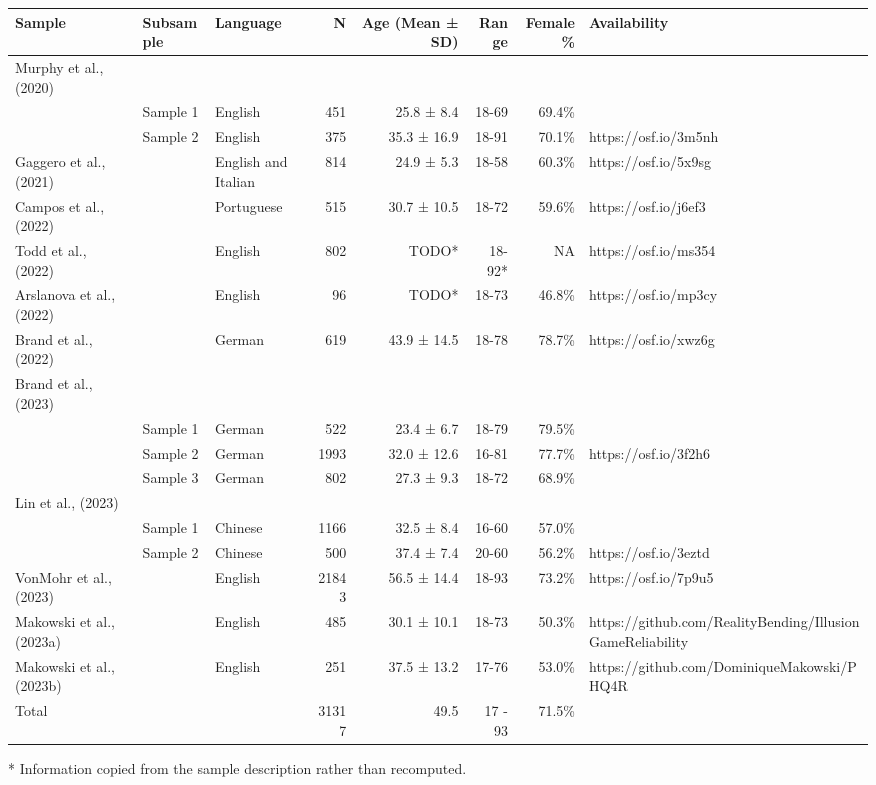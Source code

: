 \setlength{\LTpost}{0mm}
\begin{longtable}{lllrrrrl}
\toprule
Sample & Subsample & Language & N & Age (Mean  ± SD) & Range & Female \% & Availability \\ 
\midrule\addlinespace[2.5pt]
Murphy et al., (2020) &  &  &  &  &  &  &  \\ 
 & Sample 1 & English & 451 & 25.8 ± 8.4 & 18-69 & 69.4\% &  \\ 
 & Sample 2 & English & 375 & 35.3 ± 16.9 & 18-91 & 70.1\% & https://osf.io/3m5nh \\ 
Gaggero et al., (2021) &  & English and Italian & 814 & 24.9 ± 5.3 & 18-58 & 60.3\% & https://osf.io/5x9sg \\ 
Campos et al., (2022) &  & Portuguese & 515 & 30.7 ± 10.5 & 18-72 & 59.6\% & https://osf.io/j6ef3 \\ 
Todd et al., (2022) &  & English & 802 & TODO* & 18-92* & NA & https://osf.io/ms354 \\ 
Arslanova et al., (2022) &  & English & 96 & TODO* & 18-73 & 46.8\% & https://osf.io/mp3cy \\ 
Brand et al., (2022) &  & German & 619 & 43.9 ± 14.5 & 18-78 & 78.7\% & https://osf.io/xwz6g \\ 
Brand et al., (2023) &  &  &  &  &  &  &  \\ 
 & Sample 1 & German & 522 & 23.4 ± 6.7 & 18-79 & 79.5\% &  \\ 
 & Sample 2 & German & 1993 & 32.0 ± 12.6 & 16-81 & 77.7\% & https://osf.io/3f2h6 \\ 
 & Sample 3 & German & 802 & 27.3 ± 9.3 & 18-72 & 68.9\% &  \\ 
Lin et al., (2023) &  &  &  &  &  &  &  \\ 
 & Sample 1 & Chinese & 1166 & 32.5 ± 8.4 & 16-60 & 57.0\% &  \\ 
 & Sample 2 & Chinese & 500 & 37.4 ± 7.4 & 20-60 & 56.2\% & https://osf.io/3eztd \\ 
VonMohr et al., (2023) &  & English & 21843 & 56.5 ± 14.4 & 18-93 & 73.2\% & https://osf.io/7p9u5 \\ 
Makowski et al., (2023a) &  & English & 485 & 30.1 ± 10.1 & 18-73 & 50.3\% & https://github.com/RealityBending/IllusionGameReliability \\ 
Makowski et al., (2023b) &  & English & 251 & 37.5 ± 13.2 & 17-76 & 53.0\% & https://github.com/DominiqueMakowski/PHQ4R \\ 
Total &  &  & 31317 & 49.5 & 17 - 93 & 71.5\% &  \\ 
\bottomrule
\end{longtable}
\begin{minipage}{\linewidth}
* Information copied from the sample description rather than recomputed.\\
\end{minipage}

